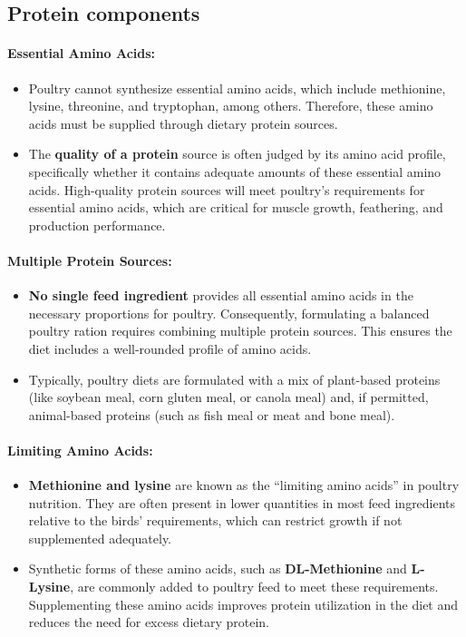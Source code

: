 \documentclass[a4paper,12pt]{article}
\begin{document}
\subsection{Protein components}

\paragraph{Essential Amino Acids:}
\begin{itemize}
	\item Poultry cannot synthesize essential amino acids, which include
methionine, lysine, threonine, and tryptophan, among others. Therefore,
these amino acids must be supplied through dietary protein sources.
	\item The \textbf{quality of a protein} source is often judged by its amino acid profile,
specifically whether it contains adequate amounts of these essential
amino acids. High-quality protein sources will meet poultry’s requirements
for essential amino acids, which are critical for muscle growth, feathering,
and production performance.
\end{itemize}

\paragraph{Multiple Protein Sources:}
\begin{itemize}
	\item \textbf{No single feed ingredient} provides all essential amino acids in the
necessary proportions for poultry. Consequently, formulating a balanced
poultry ration requires combining multiple protein sources. This ensures
the diet includes a well-rounded profile of amino acids.
	\item Typically, poultry diets are formulated with a mix of plant-based proteins
(like soybean meal, corn gluten meal, or canola meal) and, if permitted,
animal-based proteins (such as fish meal or meat and bone meal).
\end{itemize}

\paragraph{Limiting Amino Acids:}
\begin{itemize}
	\item \textbf{Methionine and lysine} are known as the “limiting amino acids” in poultry
nutrition. They are often present in lower quantities in most feed ingredients relative to the birds’ requirements, which can restrict growth if not supplemented adequately.
	\item Synthetic forms of these amino acids, such as \textbf{DL-Methionine} and \textbf{L-
Lysine}, are commonly added to poultry feed to meet these requirements.
Supplementing these amino acids improves protein utilization in the diet
and reduces the need for excess dietary protein.
\end{itemize}
\end{document}
